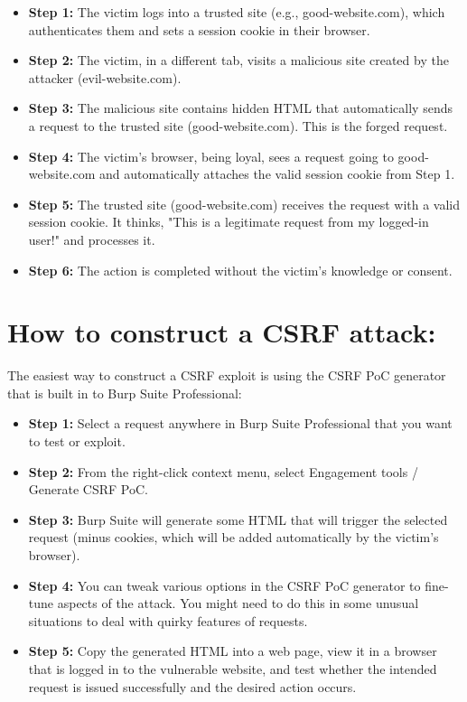 \documentclass{article}
\begin{document}
\begin{itemize}
    \item \textbf{Step 1:} The victim logs into a trusted site (e.g., good-website.com), which authenticates them and sets a session cookie in their browser.
    \item \textbf{Step 2:} The victim, in a different tab, visits a malicious site created by the attacker (evil-website.com).
         
    \item \textbf{Step 3:} The malicious site contains hidden HTML that automatically sends a request to the trusted site (good-website.com). This is the forged request.
    \item \textbf{Step 4:} The victim's browser, being loyal, sees a request going to good-website.com and automatically attaches the valid session cookie from Step 1.
    \item \textbf{Step 5:} The trusted site (good-website.com) receives the request with a valid session cookie. It thinks, "This is a legitimate request from my logged-in user!" and processes it.
    \item \textbf{Step 6:} The action is completed without the victim's knowledge or consent.
\end{itemize}

\section*{How to construct a CSRF attack:}
The easiest way to construct a CSRF exploit is using the CSRF PoC generator that is built in to Burp Suite Professional: 

\begin{itemize}
    \item \textbf{Step 1:} Select a request anywhere in Burp Suite Professional that you want to test or exploit. 
    \item \textbf{Step 2:} From the right-click context menu, select Engagement tools / Generate CSRF PoC. 
         
    \item \textbf{Step 3:} Burp Suite will generate some HTML that will trigger the selected request (minus cookies, which will be added automatically by the victim's browser). 
    \item \textbf{Step 4:} You can tweak various options in the CSRF PoC generator to fine-tune aspects of the attack. You might need to do this in some unusual situations to deal with quirky features of requests. 
    \item \textbf{Step 5:} Copy the generated HTML into a web page, view it in a browser that is logged in to the vulnerable website, and test whether the intended request is issued successfully and the desired action occurs. 
\end{itemize}
\end{document}
